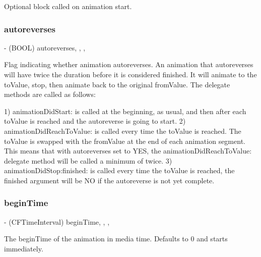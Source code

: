 Optional block called on animation start. \mbox{\label{interface_p_o_p_animation_a359e335e7c38327db8aa081416e2e90d}} 
\subsubsection{\texorpdfstring{autoreverses}{autoreverses}}
{\footnotesize\ttfamily -\/ (B\+O\+OL) autoreverses\hspace{0.3cm}{\ttfamily [read]}, {\ttfamily [write]}, {\ttfamily [nonatomic]}, {\ttfamily [assign]}}

Flag indicating whether animation autoreverses.  An animation that autoreverses will have twice the duration before it is considered finished. It will animate to the to\+Value, stop, then animate back to the original from\+Value. The delegate methods are called as follows\+: \begin{DoxyVerb}1) animationDidStart: is called at the beginning, as usual, and then after each toValue is reached and the autoreverse is going to start.
2) animationDidReachToValue: is called every time the toValue is reached. The toValue is swapped with the fromValue at the end of each animation segment. This means that with autoreverses set to YES, the animationDidReachToValue: delegate method will be called a minimum of twice.
3) animationDidStop:finished: is called every time the toValue is reached, the finished argument will be NO if the autoreverse is not yet complete.\end{DoxyVerb}
 \mbox{\label{interface_p_o_p_animation_a7cac25bf5f165045c6707fc26079cd42}} 
\subsubsection{\texorpdfstring{begin\+Time}{beginTime}}
{\footnotesize\ttfamily -\/ (C\+F\+Time\+Interval) begin\+Time\hspace{0.3cm}{\ttfamily [read]}, {\ttfamily [write]}, {\ttfamily [nonatomic]}, {\ttfamily [assign]}}

The begin\+Time of the animation in media time.  Defaults to 0 and starts immediately. \mbox{\label{interface_p_o_p_animation_ab1f8ca86441103080dd908be44631442}} 
